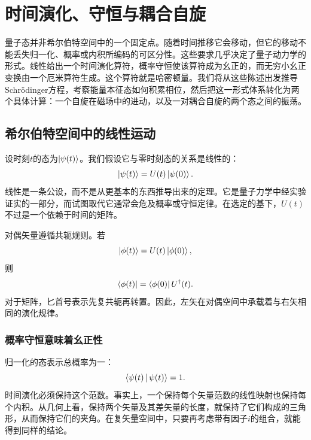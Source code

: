 \chapter{时间演化、守恒与耦合自旋}

量子态并非希尔伯特空间中的一个固定点。随着时间推移它会移动，但它的移动不能丢失归一化、概率或内积所编码的可区分性。这些要求几乎决定了量子动力学的形式。线性给出一个时间演化算符，概率守恒使该算符成为幺正的，而无穷小幺正变换由一个厄米算符生成。这个算符就是哈密顿量。我们将从这些陈述出发推导Schr\"odinger方程，考察能量本征态如何积累相位，然后把这一形式体系转化为两个具体计算：一个自旋在磁场中的进动，以及一对耦合自旋的两个态之间的振荡。

\section{希尔伯特空间中的线性运动}

设时刻\(t\)的态为\(\left\lvert\psi(t)\right\rangle\)。我们假设它与零时刻态的关系是线性的：
\begin{equation}
\left\lvert\psi(t)\right\rangle=U(t)\left\lvert\psi(0)\right\rangle.
\end{equation}
线性是一条公设，而不是从更基本的东西推导出来的定理。它是量子力学中经实验证实的一部分，而试图取代它通常会危及概率或守恒定律。在选定的基下，\(U(t)\)不过是一个依赖于时间的矩阵。

对偶矢量遵循共轭规则。若
\begin{equation}
\left\lvert\phi(t)\right\rangle=U(t)\left\lvert\phi(0)\right\rangle,
\end{equation}
则
\begin{equation}
\left\langle\phi(t)\right\rvert=\left\langle\phi(0)\right\rvert U^\dagger(t).
\end{equation}
对于矩阵，匕首号表示先复共轭再转置。因此，左矢在对偶空间中承载着与右矢相同的演化规律。

\subsection{概率守恒意味着幺正性}

归一化的态表示总概率为一：
\begin{equation}
\left\langle\psi(t)\,\middle|\,\psi(t)\right\rangle=1.
\end{equation}
时间演化必须保持这个范数。事实上，一个保持每个矢量范数的线性映射也保持每个内积。从几何上看，保持两个矢量及其差矢量的长度，就保持了它们构成的三角形，从而保持它们的夹角。在复矢量空间中，只要再考虑带有因子\(i\)的组合，就能得到同样的结论。


